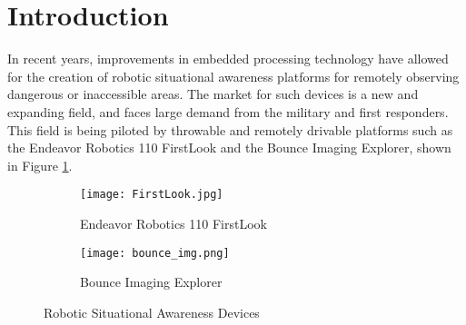 \section{Introduction}
In recent years, improvements in embedded processing technology have allowed for the creation of robotic situational awareness platforms for remotely observing dangerous or inaccessible areas. The market for such devices is a new and expanding field, and faces large demand from the military and first responders. This field is being piloted by throwable and remotely drivable platforms such as the Endeavor Robotics 110 FirstLook and the Bounce Imaging Explorer, shown in Figure \ref{robocop}.

\par
\begin{figure}[H]
       \begin{subfigure}[h]{0.5\textwidth}
            \centerline{\texttt{[image: FirstLook.jpg]}}
           \caption{Endeavor Robotics 110 FirstLook \cite{endeavor}}
       \end{subfigure}
       \begin{subfigure}[h]{0.5\textwidth}
           \centerline{\texttt{[image: bounce\_img.png]}}
           \caption{Bounce Imaging Explorer \cite{bounceImaging}}
       \end{subfigure}
\caption{Robotic Situational Awareness Devices}
\label{robocop}
\end{figure}
\par

